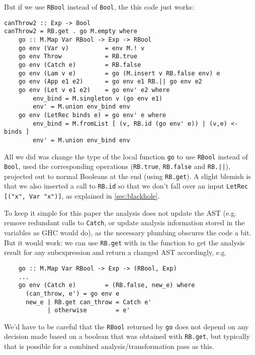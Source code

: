 \documentclass[manuscript,screen,acmsmall]{acmart}
\begin{document}
But if we use \verb|RBool| instead of \verb|Bool|, the this code just works:
\begin{verbatim}
canThrow2 :: Exp -> Bool
canThrow2 = RB.get . go M.empty where
    go :: M.Map Var RBool -> Exp -> RBool
    go env (Var v)          = env M.! v
    go env Throw            = RB.true
    go env (Catch e)        = RB.false
    go env (Lam v e)        = go (M.insert v RB.false env) e
    go env (App e1 e2)      = go env e1 RB.|| go env e2
    go env (Let v e1 e2)    = go env' e2 where
        env_bind = M.singleton v (go env e1)
        env' = M.union env_bind env
    go env (LetRec binds e) = go env' e where
        env_bind = M.fromList [ (v, RB.id (go env' e)) | (v,e) <- binds ]
        env' = M.union env_bind env
\end{verbatim}
All we did was change the type of the local function \verb|go| to use \verb|RBool| instead of \verb|Bool|, used the corresponding operations (\verb|RB.true|, \verb|RB.false| and \verb+RB.||+), projected out to normal Booleans at the end (using \verb|RB.get|). A slight blemish is that we also inserted a call to \verb|RB.id| so that we don't fall over an input \verb|LetRec [("x", Var "x")]|, as explained in \cref{sec:blackhole}.

To keep it simple for this paper the analysis does not update the AST (e.g. remove redundant calls to \verb|Catch|, or update analysis information stored in the variables as GHC would do), as the necessary plumbing obscures the code a bit. But it would work: we can use \verb|RB.get|  with in the function to get the analysis result for any subexpression and return a changed AST accordingly, e.g.
\begin{verbatim}
    go :: M.Map Var RBool -> Exp -> (RBool, Exp)
    ...
    go env (Catch e)        = (RB.false, new_e) where
      (can_throw, e') = go env e
      new_e | RB.get can_throw = Catch e'
            | otherwise        = e'
\end{verbatim}
We'd have to be careful that the \verb|RBool| returned by \verb|go| does not depend on any decision made based on a boolean that was obtained with \verb|RB.get|, but typically that is possible for a combined analysis/transformation pass as this.
\end{document}
